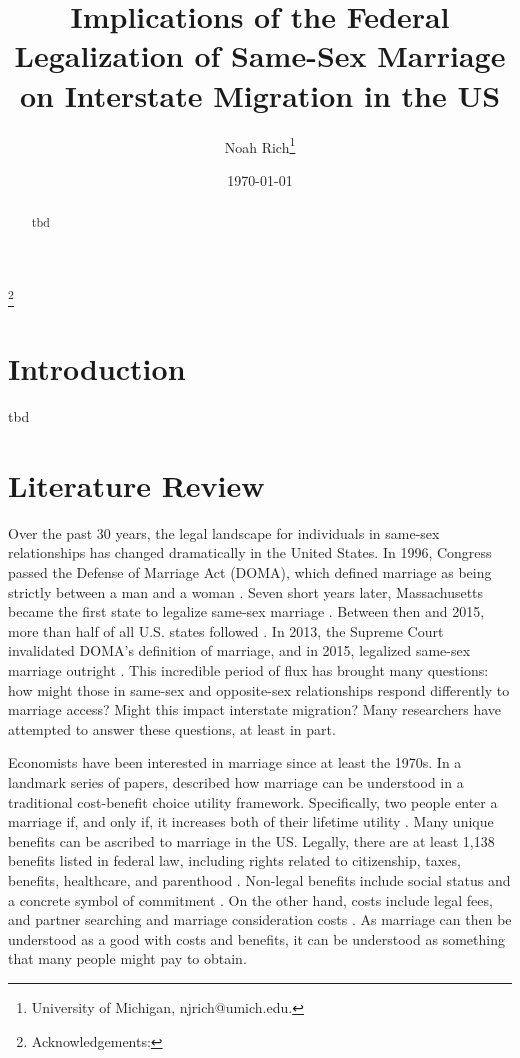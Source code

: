 \documentclass[12pt,letterpaper]{article}
\title{Implications of the Federal Legalization of Same-Sex Marriage on Interstate Migration in the US}
\author{Noah Rich\footnote{University of Michigan, njrich@umich.edu.}}
\date{\today}
\begin{document}
\maketitle
\footnote{Acknowledgements:}

\begin{abstract}
    tbd
\end{abstract}

\newpage

\section{Introduction}

tbd

\section{Literature Review}
Over the past 30 years, the legal landscape for individuals in same-sex relationships has changed dramatically in the United States. In 1996, Congress passed the Defense of Marriage Act (DOMA), which defined marriage as being strictly between a man and a woman \citep{5}. Seven short years later, Massachusetts became the first state to legalize same-sex marriage \citep{1, 3, 5}. Between then and 2015, more than half of all U.S. states followed \citep{12}. In 2013, the Supreme Court invalidated DOMA’s definition of marriage, and in 2015, legalized same-sex marriage outright \citep{1, 3, 5, 12}. This incredible period of flux has brought many questions: how might those in same-sex and opposite-sex relationships respond differently to marriage access? Might this impact interstate migration? Many researchers have attempted to answer these questions, at least in part.

Economists have been interested in marriage since at least the 1970s. In a landmark series of papers, \citet{9} described how marriage can be understood in a traditional cost-benefit choice utility framework. Specifically, two people enter a marriage if, and only if, it increases both of their lifetime utility \citep{9}. Many unique benefits can be ascribed to marriage in the US. Legally, there are at least 1,138 benefits listed in federal law, including rights related to citizenship, taxes, benefits, healthcare, and parenthood \citep{1, 8}. Non-legal benefits include social status and a concrete symbol of commitment \citep{8}. On the other hand, costs include legal fees, and partner searching and marriage consideration costs \citep{9}. As marriage can then be understood as a good with costs and benefits, it can be understood as something that many people might pay to obtain. 
\end{document}
